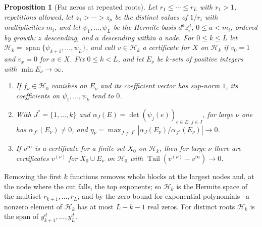 \documentclass[11pt]{article}
\newtheorem{proposition}[theorem]{Proposition}
\theoremstyle{definition}
\theoremstyle{plain}
\DeclareMathOperator{\Tail}{Tail}
\begin{document}
\begin{proposition}[Far zeros at repeated roots]\label{prop:farrep}
Let $r_1\le\cdots\le r_L$ with $r_1>1$, repetitions allowed, let
$z_1>\cdots>z_p$ be the distinct values of $1/r_i$ with multiplicities $m_i$,
and let $\psi_1,\ldots,\psi_L$ be the Hermite basis $d^az_i^d$,
$0\le a<m_i$, ordered by growth: $z$ descending, and $a$ descending within a
node.  For $0\le k\le L$ let
$\mathcal H_k=\operatorname{span}\{\psi_{k+1},\ldots,\psi_L\}$, and call
$v\in\mathcal H_k$ a certificate for $X$ on $\mathcal H_k$ if $v_0=1$ and
$v_x=0$ for $x\in X$.  Fix $0\le k<L$, and let $E_\nu$ be $k$-sets of positive
integers with $\min E_\nu\to\infty$.
\begin{enumerate}
\item[(a)] If $f_\nu\in\mathcal H_0$ vanishes on $E_\nu$ and its coefficient
vector has sup-norm $1$, its coefficients on $\psi_1,\ldots,\psi_k$ tend to
$0$.
\item[(b)] With $J^*=\{1,\ldots,k\}$ and
$\alpha_J(E)=\det(\psi_j(e))_{e\in E,\,j\in J}$, for large $\nu$ one has
$\alpha_{J^*}(E_\nu)\ne0$, and
$\eta_\nu=\max_{J\ne J^*}|\alpha_J(E_\nu)/\alpha_{J^*}(E_\nu)|\to0$.
\item[(c)] If $v^\infty$ is a certificate for a finite set $X_0$ on
$\mathcal H_k$, then for large $\nu$ there are certificates $v^{(\nu)}$ for
$X_0\cup E_\nu$ on $\mathcal H_0$ with $\Tail(v^{(\nu)}-v^\infty)\to0$.
\end{enumerate}
\end{proposition}

Removing the first $k$ functions removes whole blocks at the largest nodes
and, at the node where the cut falls, the top exponents; so $\mathcal H_k$ is
the Hermite space of the multiset $r_{k+1},\ldots,r_L$, and by the zero bound
for exponential polynomials~\cite[Part~Five, Ch.~1]{polya-szego} a nonzero
element of $\mathcal H_k$ has at most $L-k-1$ real zeros.  For distinct roots
$\mathcal H_k$ is the span of
$y_{k+1}^d,\ldots,y_L^d$.
\end{document}
